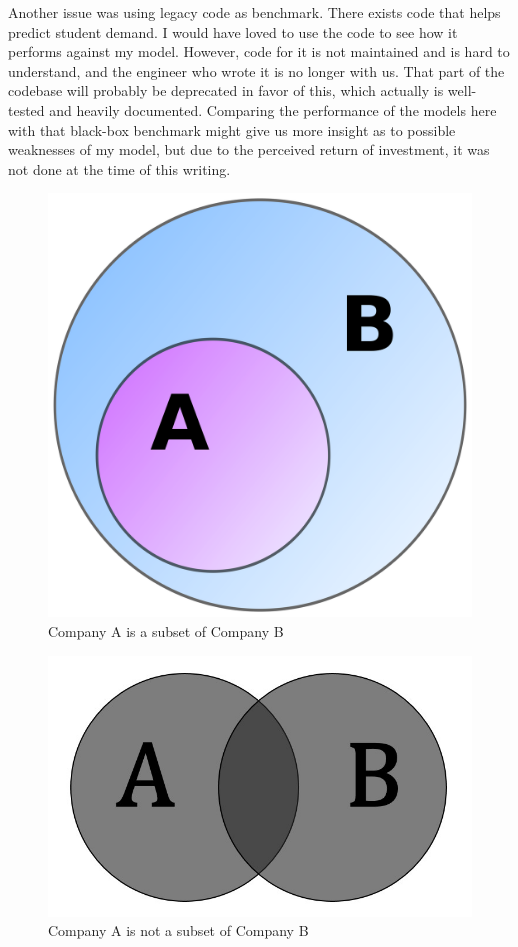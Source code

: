 \documentclass[oneside]{article}
\begin{document}
Another issue was using legacy code as benchmark. There exists code that helps
predict student demand. I would have loved to use the code to see how it
performs against my model. However, code for it is not maintained and is hard
to understand, and the engineer who wrote it is no longer with us. That part of
the codebase will probably be deprecated in favor of this, which actually is
well-tested and heavily documented. Comparing the performance of the models
here with that black-box benchmark might give us more insight as to possible
weaknesses of my model, but due to the perceived return of investment, it was
not done at the time of this writing.

\begin{figure}[h!]
\centering
\includegraphics[scale=0.05]{img/venn_a_subset_b.png}
\caption{Company A is a subset of Company B}
\label{fig:venn_a_subset_b}
\end{figure}

\begin{figure}[h!]
\centering
\includegraphics[scale=0.1]{img/venn_a_and_b.jpg}
\caption{Company A is not a subset of Company B}
\label{fig:venn_a_and_b}
\end{figure}
\end{document}
